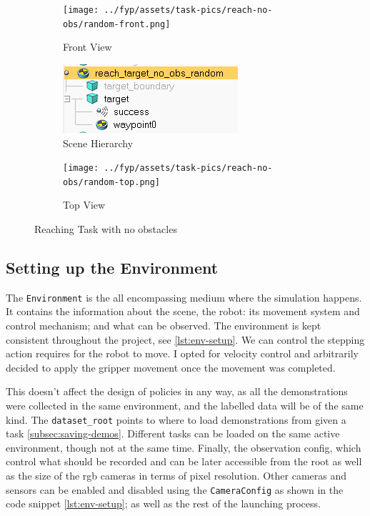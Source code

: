 \begin{figure}[htbp]
  \centering
  \begin{subfigure}{0.30\linewidth}
    \centering
    \texttt{[image: ../fyp/assets/task-pics/reach-no-obs/random-front.png]}      
    \caption{Front View}
  \end{subfigure}%
  \hfill
  \begin{subfigure}{0.30\linewidth}
    \centering
    \includegraphics[width=0.8\linewidth]{assets/early-work/random-scene-hierarchy.png}
    \caption{Scene Hierarchy}\label{fig:reach-no-obs-hierarchy}
  \end{subfigure}%
  \hfill
  \begin{subfigure}{0.30\linewidth}
    \centering
    \texttt{[image: ../fyp/assets/task-pics/reach-no-obs/random-top.png]}
    \caption{Top View}
  \end{subfigure}
  \caption{Reaching Task with no obstacles}\label{fig:reach-no-obs}
\end{figure}

\subsection{Setting up the Environment}
The \verb|Environment| is the all encompassing medium where the simulation happens. It contains the information about the scene, the robot: its movement system and control mechanism; and what can be observed. The environment is kept consistent throughout the project, see \ref{lst:env-setup}. We can control the stepping action requires for the robot to move. I opted for velocity control and arbitrarily decided to apply the gripper movement once the movement was completed.

This doesn't affect the design of policies in any way, as all the demonstrations were collected in the same environment, and the labelled data will be of the same kind. The \verb|dataset_root| points to where to load demonstrations from given a task \ref{subsec:saving-demos}. Different tasks can be loaded on the same active environment, though not at the same time. Finally, the observation config, which control what should be recorded and can be later accessible from the root as well as the size of the rgb cameras in terms of pixel resolution. Other cameras and sensors can be enabled and disabled using the \verb|CameraConfig| as shown in the code snippet \ref{lst:env-setup}; as well as the rest of the launching process.

